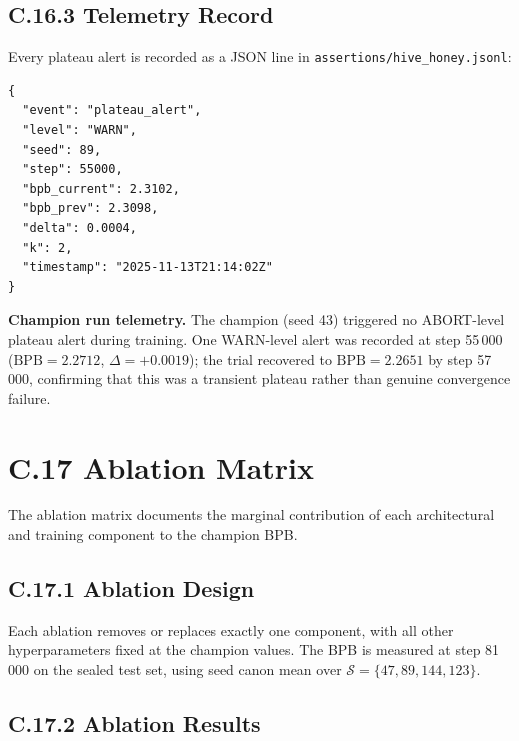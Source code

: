 \subsection*{C.16.3 Telemetry Record}

Every plateau alert is recorded as a JSON line in
\texttt{assertions/hive\_honey.jsonl}:
\begin{verbatim}
{
  "event": "plateau_alert",
  "level": "WARN",
  "seed": 89,
  "step": 55000,
  "bpb_current": 2.3102,
  "bpb_prev": 2.3098,
  "delta": 0.0004,
  "k": 2,
  "timestamp": "2025-11-13T21:14:02Z"
}
\end{verbatim}

\noindent\textbf{Champion run telemetry.}
The champion (seed 43) triggered no ABORT-level plateau alert during
training.  One WARN-level alert was recorded at step 55\,000
($\text{BPB} = 2.2712$, $\Delta = +0.0019$); the trial recovered to
$\text{BPB} = 2.2651$ by step 57\,000, confirming that this was a
transient plateau rather than genuine convergence failure.

\section*{C.17 Ablation Matrix}
\label{sec:ablation-matrix}

The ablation matrix documents the marginal contribution of each
architectural and training component to the champion BPB.

\subsection*{C.17.1 Ablation Design}

Each ablation removes or replaces exactly one component, with all other
hyperparameters fixed at the champion values.  The BPB is measured at
step 81\,000 on the sealed test set, using seed canon mean over
$\mathcal{S} = \{47, 89, 144, 123\}$.

\subsection*{C.17.2 Ablation Results}

